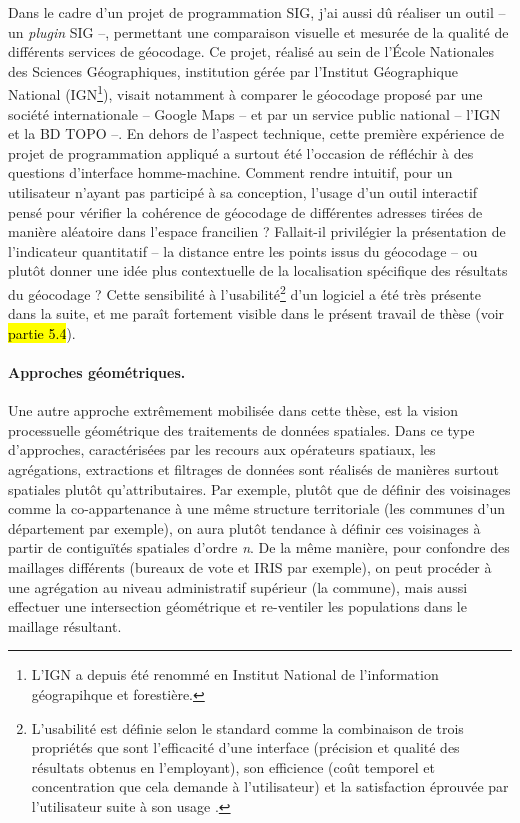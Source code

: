 Dans le cadre d'un projet de programmation SIG, j'ai aussi dû réaliser un outil -- un \textit{plugin} SIG --, permettant une comparaison visuelle et mesurée de la qualité de différents services de géocodage.
Ce projet, réalisé au sein de l'École Nationales des Sciences Géographiques, institution gérée par l'Institut Géographique National (IGN\footnote{
	L'IGN a depuis été renommé en \og Institut National de l'information géograpihque et forestière\fg{}.
}), visait notamment à comparer le géocodage proposé par une société internationale -- Google Maps -- et par un service public national -- l'IGN et la BD TOPO --.
En dehors de l'aspect technique, cette première expérience de projet de programmation appliqué a surtout été l'occasion de réfléchir à des questions d'interface homme-machine.
Comment rendre intuitif, pour un utilisateur n'ayant pas participé à sa conception, l'usage d'un outil interactif pensé pour vérifier la cohérence de géocodage de différentes adresses tirées de manière aléatoire dans l'espace francilien ?
Fallait-il privilégier la présentation de l'indicateur quantitatif  -- la distance entre les points issus du géocodage -- ou plutôt donner une idée plus contextuelle de la localisation spécifique des résultats du géocodage ?
Cette sensibilité à l'\og usabilité\fg{}\footnote{
	L'usabilité est définie selon le standard \textcite{iso20189241} comme la combinaison de trois propriétés que sont \og l'efficacité\fg{} d'une interface (précision et qualité des résultats obtenus en l'employant), son \og efficience\fg{} (coût temporel et concentration que cela demande à l'utilisateur) et la satisfaction éprouvée par l'utilisateur suite à son usage \autocite[39]{zheng_interactive_2019}.
} d'un logiciel a été très présente dans la suite, et me paraît fortement visible dans le présent travail de thèse (voir \hl{partie 5.4}).

\paragraph{Approches géométriques.}

Une autre approche extrêmement mobilisée dans cette thèse, est la vision processuelle \og géométrique\fg{} des traitements de données spatiales.
Dans ce type d'approches, caractérisées par les recours aux opérateurs spatiaux, les agrégations, extractions et filtrages de données sont réalisés de manières surtout spatiales plutôt qu'attributaires.
Par exemple, plutôt que de définir des voisinages comme la co-appartenance à une même structure territoriale (les communes d'un département par exemple), on aura plutôt tendance à définir ces voisinages à partir de contiguïtés spatiales d'ordre \textit{n}.
De la même manière, pour confondre des maillages différents (bureaux de vote et IRIS par exemple), on peut procéder à une agrégation au niveau administratif supérieur (la commune), mais aussi effectuer une intersection géométrique et re-ventiler les populations dans le maillage résultant.

